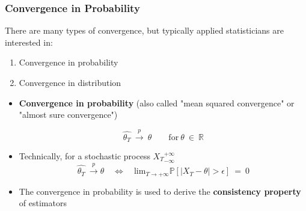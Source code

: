 \documentclass{beamer}
\begin{document}
  \begin{frame}
    \frametitle{Convergence in Probability}
    There are many types of convergence, but typically applied statisticians are interested in:
   
    \begin{enumerate}
      \item Convergence in probability
      \item Convergence in distribution
    \end{enumerate}

    \begin{itemize}
\item  \textbf{Convergence in probability} (also called "mean squared convergence" or "almost sure convergence")

  \begin{equation*}
    \hat{\theta_T} \ \overset{p}{\to} \ \theta \qquad \text{for} \ \theta \ \in \ \mathbb{R}
  \end{equation*}

\item Technically, for a stochastic process ${X_T}_{-\infty}^ {+\infty}$
  \begin{equation*}
  \hat{\theta_T} \ \overset{p}{\to} \theta \quad \Leftrightarrow \quad \text{lim}_{T \to +\infty} \mathbb{P} \left[ |X_T - \theta| > \epsilon \right] \ = \ 0 
  \end{equation*}
    
\item The convergence in probability is used to derive the \textbf{consistency property} of estimators

    \end{itemize}
    
  \end{frame}
  
\end{document}
